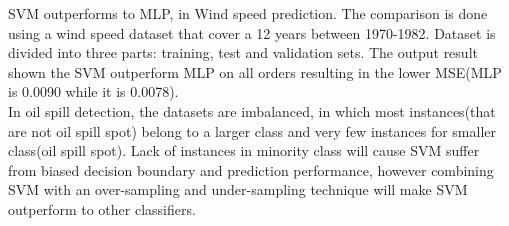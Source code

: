 SVM outperforms to MLP, in Wind speed prediction. The comparison is done using a wind speed dataset that cover a 12 years between 1970-1982. Dataset is divided into three parts: training, test and validation sets. The output result shown the SVM outperform MLP on all orders resulting in the lower MSE(MLP is 0.0090 while it is 0.0078)\cite{Mohandes2004939}.\\
In oil spill detection, the datasets are imbalanced, in which most instances(that are not oil spill spot) belong to a larger class and very few instances for smaller class(oil spill spot). Lack of instances in minority class will cause SVM suffer from biased decision boundary and prediction performance, however combining SVM with an over-sampling and under-sampling technique will make SVM outperform to other classifiers\cite{liu2006boosting}.

	
      




	